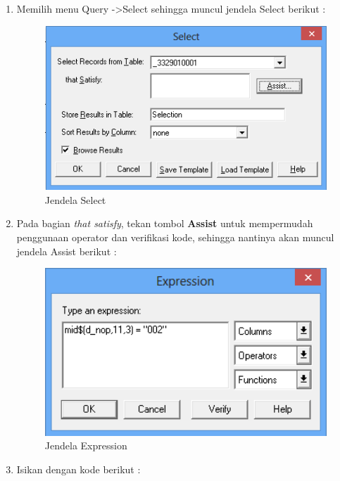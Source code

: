 \begin{enumerate}[1.]
  \item Memilih menu Query -\textgreater Select sehingga muncul jendela Select berikut :
  
  \begin{figure}[H]
    \centering
    \includegraphics[width=1\textwidth]{./resources/070-jendela-select}
    \caption{Jendela Select}
  \end{figure}
  
  \item Pada bagian \textit{that satisfy}, tekan tombol \textbf{Assist} untuk mempermudah penggunaan operator dan verifikasi kode, sehingga nantinya akan muncul jendela Assist berikut :
  
  \begin{figure}[H]
    \centering
    \includegraphics[width=1\textwidth]{./resources/071-jendela-expression}
    \caption{Jendela Expression}
  \end{figure}
  
  \item Isikan dengan kode berikut :
  

\end{enumerate}

